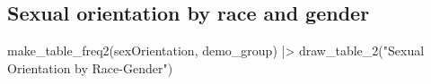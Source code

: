 \documentclass[
  letterpaper,
  DIV=11,
  numbers=noendperiod,
  oneside]{scrreprt}
\newenvironment{Shaded}{\begin{snugshade}}{\end{snugshade}}
\newcommand{\FunctionTok}[1]{\textcolor[rgb]{0.28,0.35,0.67}{#1}}
\newcommand{\NormalTok}[1]{\textcolor[rgb]{0.00,0.23,0.31}{#1}}
\newcommand{\SpecialCharTok}[1]{\textcolor[rgb]{0.37,0.37,0.37}{#1}}
\newcommand{\StringTok}[1]{\textcolor[rgb]{0.13,0.47,0.30}{#1}}
\begin{document}
\hypertarget{sexual-orientation-by-race-and-gender}{%
\subsection*{Sexual orientation by race and
gender}\label{sexual-orientation-by-race-and-gender}}

\begin{Shaded}
\begin{Highlighting}[]
\FunctionTok{make\_table\_freq2}\NormalTok{(sexOrientation, demo\_group)  }\SpecialCharTok{|\textgreater{}}
  \FunctionTok{draw\_table\_2}\NormalTok{(}\StringTok{"Sexual Orientation by Race{-}Gender"}\NormalTok{) }
\end{Highlighting}
\end{Shaded}
\end{document}
